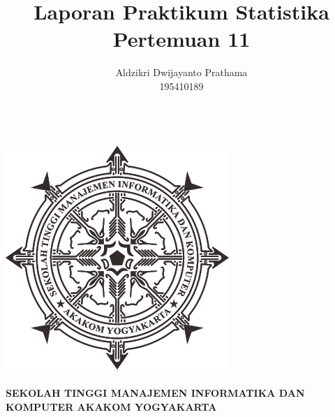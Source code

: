 \documentclass[a4paper,12pt]{article}
\begin{document}
\title{Laporan Praktikum Statistika Pertemuan 11}
\author{Aldzikri Dwijayanto Prathama 
	\\195410189}
\makeatletter
\begin{titlepage}
	\begin{center}
		{\huge \bfseries \@title }\\[14ex]
		\includegraphics[scale=.8]{logo}\\[4ex]
		{\large \@author}\\[20ex]
		{\large \bfseries {SEKOLAH TINGGI MANAJEMEN INFORMATIKA DAN KOMPUTER
				AKAKOM YOGYAKARTA}}
	\end{center}


\end{titlepage}
\makeatother
\newpage
\tableofcontents
\newpage
\end{document}
